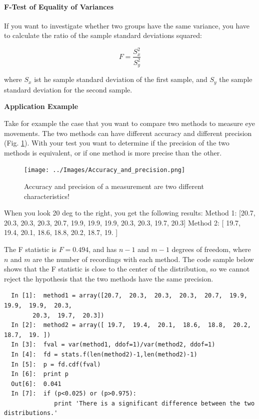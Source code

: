 \paragraph{F-Test of Equality of Variances}
If you want to investigate whether two groups have the same variance, you have to calculate the ratio of the sample standard deviations squared:

\begin{equation}
  F = \frac{S_x^2}{S_y^2}
\end{equation}

where $S_x$ ist he sample standard deviation of the first sample, and $S_y$ the sample standard deviation for the second sample.

\textbf{Application Example}

Take for example the case that you want to compare two methods to measure eye movements. The two methods
can have different accuracy and different precision (Fig. \ref{fig:accuracy}). With your test you want to
determine if the precision of the two methods is equivalent, or if one
method is more precise than the other.

\begin{figure}
  \centering
  \texttt{[image: ../Images/Accuracy\_and\_precision.png]}\\
  \caption{Accuracy and precision of a measurement are two different characteristics!}
  \label{fig:accuracy}
\end{figure}

When you look 20 deg to the right, you get the following results:
Method 1: [20.7,  20.3,  20.3,  20.3,  20.7,  19.9,  19.9,  19.9,  20.3,
        20.3,  19.7,  20.3]
Method 2: [ 19.7,  19.4,  20.1,  18.6,  18.8,  20.2,  18.7,  19. ]

The F statistic is $F = 0.494$, and has $n-1$ and $m-1$ degrees of freedom, where $n$ and $m$ are the number of recordings with each method. The code sample below shows that the F statistic is close to the center of the distribution, so we cannot reject the hypothesis that the two methods have the same precision.

\begin{lstlisting}
  In [1]:  method1 = array([20.7,  20.3,  20.3,  20.3,  20.7,  19.9,  19.9,  19.9,  20.3,
        20.3,  19.7,  20.3])
  In [2]:  method2 = array([ 19.7,  19.4,  20.1,  18.6,  18.8,  20.2,  18.7,  19. ])
  In [3]:  fval = var(method1, ddof=1)/var(method2, ddof=1)
  In [4]:  fd = stats.f(len(method2)-1,len(method2)-1)
  In [5]:  p = fd.cdf(fval)
  In [6]:  print p
  Out[6]:  0.041
  In [7]:  if (p<0.025) or (p>0.975):
              print 'There is a significant difference between the two distributions.'
\end{lstlisting}



